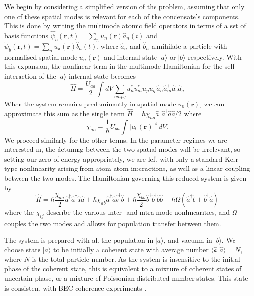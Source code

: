 \documentclass{iopart}
\begin{document}
We begin by considering a simplified version of the problem, assuming that only one of these spatial modes is relevant for each of the condensate's components.  This is done by writing the multimode atomic field operators in terms of a set of basis functions $\hat{\psi}_a({\mathbf{r}},t) = \sum_n u_{n}({\mathbf{r}}) \hat{a}_{n}(t)$ and $\hat{\psi}_b({\mathbf{r}},t) = \sum_n u_{n}({\mathbf{r}}) \hat{b}_{n}(t)$, where $\hat{a}_{n}$ and $\hat{b}_{n}$ annihilate a particle with normalised spatial mode $u_n({\mathbf{r}})$ and internal state $|a\rangle$ or $|b\rangle$ respectively. With this expansion, the nonlinear term in the multimode Hamiltonian for the self-interaction of the $|a\rangle$ internal state becomes
\begin{equation}
\hat{H} = \frac{U_{aa}}{2} \int dV \sum_{nmpq} u_n^* u_m^* u_p u_q \, \hat{a}^{\dagger}_{n} \hat{a}^{\dagger}_{m} \hat{a}_{p} \hat{a}_{q} 
\end{equation}
When the system remains predominantly in spatial mode $u_0(\mathbf{r})$, we can approximate this sum as the single term $\hat{H} = \hbar\chi_{aa} \hat{a}^{\dagger} \hat{a}^{\dagger} \hat{a} \hat{a}/2$ where
\begin{equation}
\chi_{aa} = \frac{1}{\hbar} U_{aa} \int |u_{0}({\mathbf{r}})|^4 \, dV.
\label{eqChiUequivalence}
\end{equation}
We proceed similarly for the other terms.  In the parameter regimes we are interested in, the detuning between the two spatial modes will be irrelevant, so setting our zero of energy appropriately, we are left with only a standard Kerr-type nonlinearity arising from atom-atom interactions, as well as a linear coupling between the two modes.  The Hamiltonian governing this reduced system is given by
\begin{equation}
\hat{H} = \hbar\frac{\chi_{aa}}{2} \hat{a}^{\dagger} \hat{a}^{\dagger} \hat{a} \hat{a}
          + \hbar\chi_{ab} \hat{a}^{\dagger} \hat{a} \hat{b}^{\dagger} \hat{b}
          + \hbar\frac{\chi_{bb}}{2} \hat{b}^{\dagger} \hat{b}^{\dagger} \hat{b} \hat{b}
          + \hbar\Omega (\hat{a}^{\dagger} \hat{b} + \hat{b}^{\dagger}  \hat{a} )
\label{eqTwoModeHamiltonian}
\end{equation}
where the $\chi_{ij}$ describe the various inter- and intra-mode nonlinearities, and $\Omega$ couples the two modes and allows for population transfer between them.

The system is prepared with all the population in $|a\rangle$, and vacuum in $|b\rangle$. We choose state $|a\rangle$ to be initially a coherent state with average number $\langle \hat{a}^{\dagger} \hat{a} \rangle = N$, where $N$ is the total particle number.  As the system is insensitive to the initial phase of the coherent state, this is equivalent to a mixture of coherent states of uncertain phase, or a mixture of Poissonian-distributed number states.  This state is consistent with BEC coherence experiments \cite{Hadzibabic2004}.  
\end{document}
